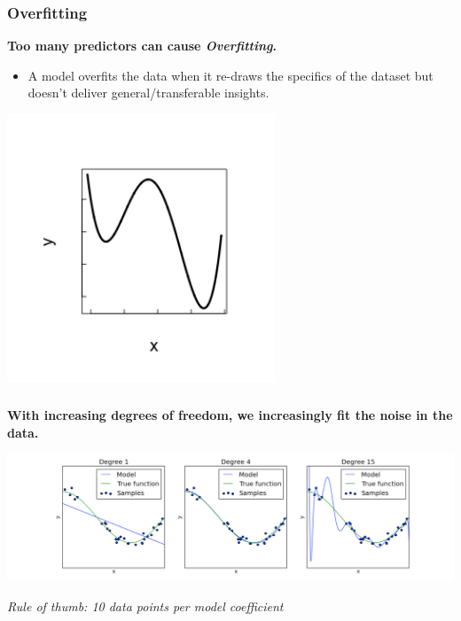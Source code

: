 \documentclass{beamer}
\begin{document}
\begin{frame}
  \frametitle{Overfitting}
  \textbf{Too many predictors can cause \textit{Overfitting}.}
  
  \begin{itemize}
    \item A model overfits the data when it re-draws the specifics of the dataset but doesn't deliver general/transferable insights.
  \end{itemize}
  
  \begin{center}
    \includegraphics[width=0.6\textwidth]{lectures/day_3_LM_refresh_II/figures/unnamed-chunk-35-1.png} 
  \end{center}
\end{frame}

\begin{frame}
    \frametitle{}   
    \textbf{With increasing degrees of freedom, we increasingly fit the noise in the data.}\\
    \vspace{0.5cm}
        
    \centering\includegraphics[width=1\textwidth]{lectures/day_3_LM_refresh_II/figures/overfitting.png}
    \vspace{0.5cm}

    \textit{Rule of thumb: 10 data points per model coefficient}
\end{frame}
\end{document}
